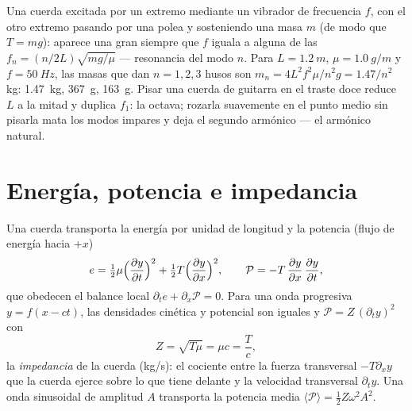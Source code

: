 \begin{example}\label{ex:b2:waves-on-strings:melde}
Una cuerda excitada por un extremo mediante un vibrador de frecuencia $f$,
con el otro extremo pasando por una polea y sosteniendo una masa $m$ (de
modo que $T = mg$): aparece una gran  siempre que $f$
iguala a alguna de las $f_n = (n/2L)
\sqrt{mg/\mu}$ --- resonancia del modo $n$. Para $L = \qty{1.2}{m}$, $\mu =
\qty{1.0}{g/m}$ y $f = \qty{50}{Hz}$, las masas que dan $n = 1, 2, 3$ husos
son $m_n = 4L^2f^2\mu/n^2g = 1.47/n^2$ kg: \qty{1.47}{kg}, \qty{367}{g}, \qty{163}{g}.
Pisar una cuerda de guitarra en el traste doce reduce $L$ a la mitad y
duplica $f_1$: la octava; rozarla suavemente en el punto medio sin pisarla
mata los modos impares y deja el segundo armónico --- el armónico natural.
\end{example}

\section{Energía, potencia e impedancia}

\begin{proposition}\label{prop:b2:waves-on-strings:energy}
Una cuerda transporta la energía por unidad de longitud y la potencia
(flujo de energía hacia $+x$)
\[
e = \tfrac12\mu\Bigl(\frac{\partial y}{\partial t}\Bigr)^2 + \tfrac12T\Bigl(\frac{\partial y}{\partial x}\Bigr)^2 ,
\qquad
\mathcal P = -T\,\frac{\partial y}{\partial x}\,\frac{\partial y}{\partial t} ,
\]
que obedecen el balance local $\partial_te + \partial_x\mathcal P = 0$. Para una
onda progresiva $y = f(x - ct)$, las densidades cinética y potencial son
iguales y $\mathcal P = Z\,(\partial_ty)^2$ con
\[
Z = \sqrt{T\mu} = \mu c = \frac Tc ,
\]
la \emph{impedancia} de la cuerda (\unit{kg/s}): el cociente entre la
fuerza transversal $-T\partial_xy$ que la cuerda ejerce sobre lo que tiene
delante y la velocidad transversal $\partial_ty$. Una onda sinusoidal de
amplitud $A$ transporta la potencia media $\langle\mathcal P\rangle = \tfrac12Z\omega^2A^2$.
\end{proposition}

